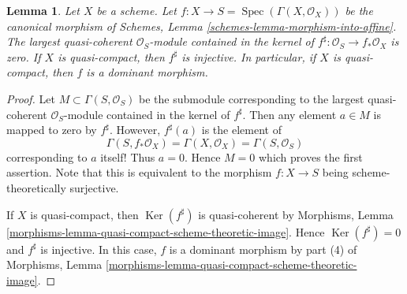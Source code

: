 \documentclass[10pt,a4paper]{amsart}
\theoremstyle{plain}
\newtheorem{lemma}[subsection]{Lemma}
\theoremstyle{definition}
\theoremstyle{remark}
\numberwithin{equation}{subsection}
\def\Spec{\mathop{\mathrm{Spec}}}
\def\Ker{\mathop{\mathrm{Ker}}}
\begin{document}
\begin{lemma}
\label{lemma-aff-is-injective-on-sheaves}
Let $X$ be a scheme. Let $f : X \to S = \Spec(\Gamma(X, \mathcal{O}_X))$
be the canonical morphism of
Schemes, Lemma \ref{schemes-lemma-morphism-into-affine}.
The largest quasi-coherent $\mathcal{O}_S$-module contained
in the kernel of $f^\sharp : \mathcal{O}_S \to f_*\mathcal{O}_X$
is zero. If $X$ is quasi-compact, then $f^\sharp$ is injective.
In particular, if $X$ is quasi-compact, then $f$ is a 
dominant morphism.
\end{lemma}

\begin{proof}
Let $M \subset \Gamma(S, \mathcal{O}_S)$ be the submodule corresponding
to the largest quasi-coherent $\mathcal{O}_S$-module contained 
in the kernel of $f^\sharp$. Then any element $a \in M$ is mapped
to zero by $f^\sharp$. However, $f^\sharp(a)$ is the element of
$$
\Gamma(S, f_*\mathcal{O}_X) = \Gamma(X, \mathcal{O}_X) =
\Gamma(S, \mathcal{O}_S)
$$
corresponding to $a$ itself! Thus $a = 0$. Hence $M = 0$ which proves
the first assertion. Note that this is equivalent to the morphism 
$f : X \to S$ being scheme-theoretically surjective.

\medskip\noindent
If $X$ is quasi-compact, then $\Ker(f^\sharp)$ is quasi-coherent by
Morphisms, Lemma \ref{morphisms-lemma-quasi-compact-scheme-theoretic-image}.
Hence $\Ker(f^\sharp) = 0$ and $f^\sharp$ is injective.
In this case, $f$ is a dominant morphism by part (4) of
Morphisms, Lemma \ref{morphisms-lemma-quasi-compact-scheme-theoretic-image}.
\end{proof}
\end{document}
